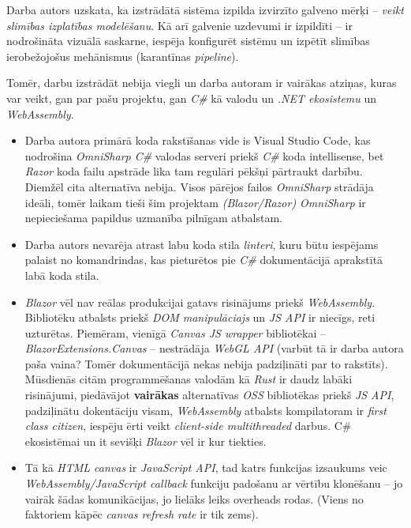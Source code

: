 Darba autors uzskata, ka izstrādātā sistēma izpilda izvirzīto galveno mērķi
-- \emph{veikt slimības izplatības modelēšanu}. Kā arī
galvenie uzdevumi ir izpildīti -- ir nodrošināta vizuālā saskarne, iespēja
konfigurēt sistēmu un izpētīt slimības ierobežojošus mehānismus (karantīnas \emph{pipeline}).

Tomēr, darbu izstrādāt nebija viegli un darba autoram ir vairākas atziņas, kuras
var veikt, gan par pašu projektu, gan \emph{C\#} kā valodu un \emph{.NET ekosistemu} un \emph{WebAssembly}.

\begin{itemize}
    \item Darba autora primārā koda rakstīšanas vide is Visual Studio Code, kas
    nodrošina \emph{OmniSharp C\#} valodas serveri priekš \emph{C\#} koda intellisense,
    bet \emph{Razor} koda
    failu apstrāde lika tam regulāri pēkšņi pārtraukt darbību. Diemžēl cita alternatīva
    nebija. Visos pārējos failos \emph{OmniSharp} strādāja ideāli, tomēr laikam tieši šim projektam
    \emph{(Blazor/Razor) OmniSharp} ir nepieciešama papildus uzmanība pilnīgam atbalstam.

    \item Darba autors nevarēja atrast labu koda stila \emph{linteri}, kuru būtu iespējams
    palaist no komandrindas, kas pieturētos pie \emph{C\#} dokumentācijā aprakstītā labā koda stila\cite{csharp:code-conventions}.

    \item \emph{Blazor} vēl nav reālas produkcijai gatavs risinājums priekš \emph{WebAssembly}.
    Bibliotēku atbalsts priekš \emph{DOM manipulāciajs} un \emph{JS API} ir niecīgs, reti uzturētas.
    Piemēram, vienīgā \emph{Canvas JS wrapper} bibliotēkai -- \emph{BlazorExtensions.Canvas} --
    nestrādāja \emph{WebGL API} (varbūt tā ir darba autora paša vaina? Tomēr
    dokumentācijā nekas nebija padziļināti par to rakstīts). Mūsdienās citām programmēšanas valodām kā \emph{Rust}
    ir daudz labāki risinājumi, piedāvājot \textbf{vairākas} alternatīvas \emph{OSS}
    bibliotēkas priekš \emph{JS API}, padziļinātu dokentāciju visam,
    \emph{WebAssembly} atbalsts kompilatoram ir \emph{first class citizen}, iespēju
    ērti veikt \emph{client-side multithreaded} darbus. C\# ekosistēmai un it
    sevišķi \emph{Blazor} vēl ir kur tiekties.

    \item Tā kā \emph{HTML canvas} ir
    \emph{JavaScript API}, tad katrs funkcijas izsaukums veic \emph{WebAssembly/JavaScript callback}
    funkciju padošanu ar vērtību klonēšanu -- jo vairāk šādas komunikācijas, jo
    lielāks leiks overheads rodas. (Viens no faktoriem kāpēc \emph{canvas refresh rate} ir tik zems).


\end{itemize}
